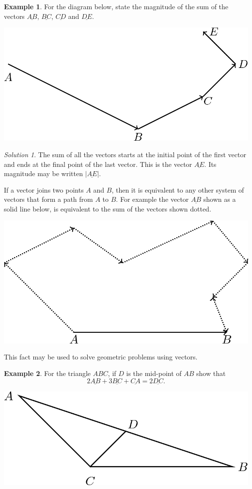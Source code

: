 \documentclass[
  11pt,
  oneside]{book}
\newcommand{\slide}{}
\theoremstyle{definition}
\theoremstyle{definition}
\newtheorem{example}{Example}[chapter]
\theoremstyle{definition}
\theoremstyle{definition}
\theoremstyle{remark}
\newtheorem*{solution}{Solution}
\begin{document}
\slide

\begin{example}

For the diagram below, state the magnitude of the sum of the vectors \(\underline{AB}\), \(\underline{BC}\), \(\underline{CD}\) and \(\underline{DE}\).

\begin{center}\includegraphics[width=0.3\linewidth]{tikztopng-figure53} \end{center}

\end{example}

\begin{solution}
The sum of all the vectors starts at the initial point of the first vector and ends at the final point of the last vector. This is the vector \(\underline{AE}\). Its magnitude may be written \(|\underline{AE}|\).
\end{solution}

If a vector joins two points \(A\) and \(B\), then it is equivalent to any other system of vectors that form a path from \(A\) to \(B\). For example the vector \(\underline{AB}\) shown as a solid line below, is equivalent to the sum of the vectors shown dotted.

\begin{center}\includegraphics[width=0.3\linewidth]{tikztopng-figure54} \end{center}

This fact may be used to solve geometric problems using vectors.

\slide

\begin{example}

For the triangle \(ABC\), if \(D\) is the mid-point of \(AB\) show that
\[
2\underline{AB}+3\underline{BC}+\underline{CA} = 2\underline{DC}.\tag{1}
\]

\begin{center}\includegraphics[width=0.3\linewidth]{tikztopng-figure55} \end{center}

\end{example}
\end{document}
